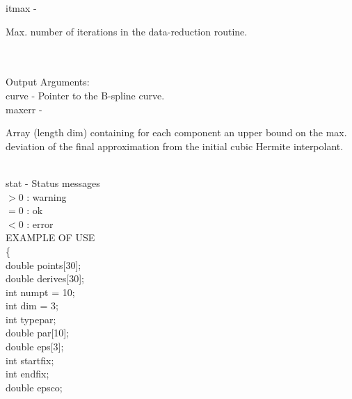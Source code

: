         \>\>    {\fov itmax}    \> - \> \begin{minipg2}
                                Max. number of iterations in the data-reduction routine.
                                \end{minipg2}\\[0.8ex]
\\
        \>Output Arguments:\\
        \>\>    {\fov curve}    \> - \> Pointer to the B-spline curve.\\
        \>\>    {\fov maxerr}   \> - \> \begin{minipg2}
                                Array (length dim)
                                containing for each component an upper
                                bound on the max. deviation of the final
                                approximation from the initial cubic Hermite
                                interpolant.
                                \end{minipg2}\\[0.3ex]
        \>\>    {\fov stat}     \> - \> Status messages\\
                \>\>\>\>\>              $> 0$   : warning\\
                \>\>\>\>\>              $= 0$   : ok\\
                \>\>\>\>\>              $< 0$   : error\\
\newpagetabs
EXAMPLE OF USE\\
                \>      \{ \\
                \>\>    double  \>      {\fov points}[30];\\
                \>\>    double  \>      {\fov derives}[30];\\
                \>\>    int     \>      {\fov numpt} = 10;\\
                \>\>    int     \>      {\fov dim} = 3;\\
                \>\>    int     \>      {\fov typepar};\\
                \>\>    double  \>      {\fov par}[10];\\
                \>\>    double  \>      {\fov eps}[3];\\
                \>\>    int     \>      {\fov startfix};\\
                \>\>    int     \>      {\fov endfix};\\
                \>\>    double  \>      {\fov epsco};\\
